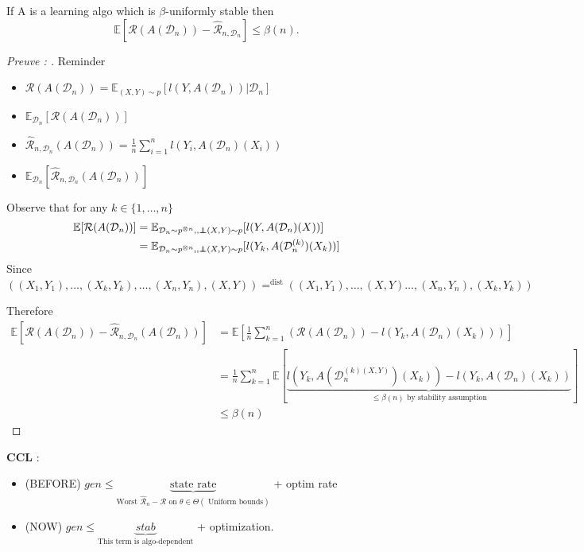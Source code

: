 \begin{thm}
    If A is a learning algo which is $ \beta  $-uniformly stable then 
    \[
        \mathbb{E}[ \mathcal{R}(A(\mathcal{D}_n)) - \hat{\mathcal{R}}_{n,\mathcal{D}_n}] \leq \beta (n)
    .\]
\end{thm}
\begin{proof}[Preuve : ]
    Reminder \begin{itemize}
        \item $ \mathcal{R} (A(\mathcal{D}_n)) = \mathbb{E}_{(X,Y) \sim p}[ l(Y, A(\mathcal{D}_n)) | \mathcal{D}_n] $ 
        \item $ \mathbb{E}_{\mathcal{D}_n} [ \mathcal{R}(A (\mathcal{D}_n))] $ 
        \item $ \hat{\mathcal{R}}_{n, \mathcal{D}_n} (A(\mathcal{D}_n)) = \frac{1}{n} \sum_{i=1}^{n } l (Y_i, A(\mathcal{D}_n) (X_i)) $ 
        \item $ \mathbb{E}_{\mathcal{D}_n} [ \hat{\mathcal{R}}_{n, \mathcal{D}_n}(A (\mathcal{D}_n))] $ 
    \end{itemize}
    Observe that for any $ k \in \{1, \dots, n\} $ 
    \begin{align*}
        \mathbb{E} [\mathcal{R}(A(\mathcal{D}_n))]
            &= \mathbb{E}_{ \mathcal{D}_n \sim p^{\otimes n} ,, \ind (X,Y)\sim p} [ l(Y, A (\mathcal{D}_n) (X)) ] \\
            &= \mathbb{E}_{ \mathcal{D}_n \sim p^{\otimes n} ,, \ind (X,Y)\sim p} [ l(Y_k, A(\mathcal{D}_n^{(k)}) (X_k))]
    \end{align*}
    Since $ ( (X_1, Y_1), \dots, (X_k, Y_k), \dots, (X_n, Y_n), (X,Y) ) = ^{\text{dist}} ( (X_1, Y_1), \dots, (X, Y) \dots, (X_n, Y_n), (X_k,Y_k) )$ 

    Therefore
    \begin{align*}
        \mathbb{E} [\mathcal{R}(A(\mathcal{D}_n)) - \hat{\mathcal{R}}_{n, \mathcal{D}_n} (A(\mathcal{D}_n))] 
            &= \mathbb{E}[ \frac{1}{n} \sum_{k=1}^{n} ( \mathcal{R} (A ( \mathcal{D}_n) ) - l ( Y_k, A(\mathcal{D}_n) (X_k)))] \\
            &= \frac{1}{n} \sum_{k=1 }^{n} \mathbb{E}[ \underbrace{l( Y_k, A(\mathcal{D}_n ^{(k) (X,Y) })(X_k) ) -l (Y_k , A(\mathcal{D}_n) (X_k))}_{ \leq \beta (n) \text{ by stability assumption}} ] \\
            &\leq \beta (n)
    \end{align*}
\end{proof}

\textbf{CCL} : 
\begin{itemize}
    \item (BEFORE) $ gen \leq \underbrace{\text{state rate}}_{\text{Worst } \hat{\mathcal{R}}_n - \mathcal{R} \text{ on } \theta \in \Theta ( \text{ Uniform bounds})}$ + optim rate \\
    \item (NOW) $ gen \leq \underbrace{stab}_{\text{This term is algo-dependent}} $ + optimization.
\end{itemize}


